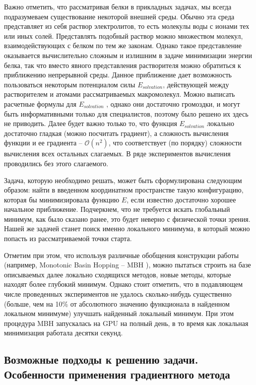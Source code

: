   Важно отметить, что рассматривая белки в прикладных задачах, мы всегда подразумеваем существование некоторой внешней среды.
  Обычно эта среда представляет из себя раствор электролитов, то есть молекулы воды с ионами тех или иных солей.
  Представлять подобный раствор можно множеством молекул, взаимодействующих с белком по тем же законам.
  Однако такое представление оказывается вычислительно сложным и излишним в задаче минимизации энергии белка, так что вместо явного представления растворителя можно обратиться к приближению непрерывной среды.
  Данное приближение дает возможность пользоваться некоторым потенциалом силы $E_{solvation}$, действующей между растворителем и атомами рассматриваемых макромолекул.
  Можно выписать расчетные формулы для $E_{solvation}$ \cite{still1990semianalytical}, однако они достаточно громоздки, и могут быть информативными только для специалистов, поэтому было решено их здесь не приводить.
  Далее будет важно только то, что функция $E_{solvation}$ локально достаточно гладкая (можно посчитать градиент), а сложность вычисления функции и ее градиента -- $\mathcal{O}\left( n^2 \right)$, что соответствует (по порядку) сложности вычисления всех остальных слагаемых.
  В ряде экспериментов вычисления проводились без этого слагаемого.

  Задача, которую необходимо решать, может быть сформулирована следующим образом: найти в введенном координатном пространстве такую конфигурацию, которая бы минимизировала функцию $E$, если известно достаточно хорошее начальное приближение. Подчеркнем, что не требуется искать глобальный минимум, как было сказано ранее, это будет неверно с физической точки зрения.
  Нашей же задачей станет поиск именно локального минимума, в который можно попасть из рассматриваемой точки старта.

  Отметим при этом, что используя различные обобщения конструкции работы \cite{wales1997global} (например, Monotonic Basin Hopping -- MBH \cite{posypkin2010}), можно пытаться строить на базе описываемых далее локально сходящихся методов, новые методы, которые находят более глубокий минимум.
  Однако стоит отметить, что в подавляющем числе проведенных экспериментов не удалось сколько-нибудь существенно (больше, чем на 10\% от абсолютного значению функционала в найденном локальном минимуме) улучшать найденный локальный минимум.
  При этом процедура MBH запускалась на GPU на полный день, в то время как локальная минимизация работала десятки секунд.

  \subsection{Возможные подходы к решению задачи. Особенности применения градиентного метода}\label{subsec:sec1/su3}

